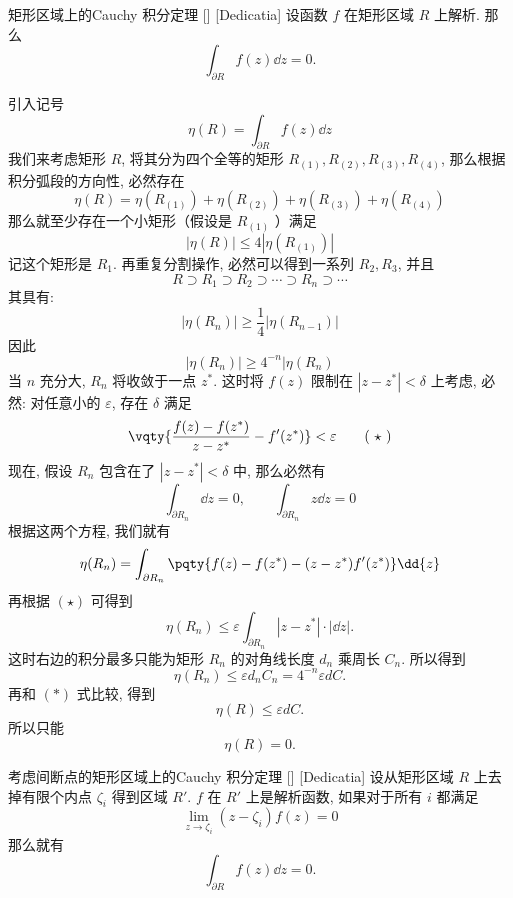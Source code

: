 \documentclass[UTF8]{ctexart}
\begin{document}
        \begin{thm}
            [UUID]
            {矩形区域上的Cauchy 积分定理}
            []
            [Dedicatia]
            设函数 \(f\) 在矩形区域 \(R\) 上解析. 那么
            \[\int_{\partial R}f(z)\dd{z}=0.\]
        \end{thm}

        \begin{prf}
            引入记号
            \[\eta(R)=\int_{\partial R}f(z)\dd{z}\]
            我们来考虑矩形 \(R\), 将其分为四个全等的矩形 \(R_{(1)}, R_{(2)}, R_{(3)}, R_{(4)}\), 那么根据积分弧段的方向性, 必然存在
            \[\eta(R)=\eta(R_{(1)})+\eta(R_{(2)})+\eta(R_{(3)})+\eta(R_{(4)})\]
            那么就至少存在一个小矩形（假设是 \(R_{(1)}\) ）满足
            \[|\eta(R)|\leqslant 4|\eta(R_{(1)})|\]
            记这个矩形是 \(R_1\). 再重复分割操作, 必然可以得到一系列 \(R_2, R_3\), 并且
            \[R\supset R_1\supset R_2\supset\cdots\supset R_n\supset\cdots\]
            其具有: 
            \[|\eta(R_n)|\geqslant \frac{1}{4}|\eta(R_{n-1})|\]
            因此
            \[|\eta(R_n)|\geqslant 4^{-n}|\eta(R_n)\tag{ \(\ast\) }\]
            当 \(n\) 充分大,  \(R_n\) 将收敛于一点 \(z^*\). 这时将 \(f(z)\) 限制在 \(|z-z^*|<\delta \) 上考虑, 必然: 对任意小的 \(\varepsilon\), 存在 \(\delta\) 满足
            \[\vqty{\frac{f(z)-f(z^*)}{z-z^*}-f'(z^*)}<\varepsilon\tag{ \(\star\) }\]
            现在, 假设 \(R_n\) 包含在了 \(|z-z^*|<\delta\) 中, 那么必然有
            \[\int_{\partial R_n}\dd{z}=0,\qquad\int_{\partial R_n}z\dd{z}=0\]
            根据这两个方程, 我们就有
            \[\eta(R_n)=\int_{\partial R_n}\pqty{f(z)-f(z^*)-(z-z^*)f'(z^*)}\dd{z}\]
            再根据 \((\star)\) 可得到
            \[\eta(R_n)\leqslant\varepsilon\int_{\partial R_n}|z-z^*|\cdot|\dd z|. \]
            这时右边的积分最多只能为矩形 \(R_n\) 的对角线长度 \(d_n\) 乘周长 \(C_n\). 所以得到
            \[\eta(R_n)\leqslant\varepsilon d_nC_n=4^{-n}\varepsilon dC.\]
            再和 \((\ast)\) 式比较, 得到
            \[\eta(R)\leqslant\varepsilon dC.\]
            所以只能
            \[\eta(R)=0.\]
        \end{prf}

        \begin{thm}
            [UUID]
            {考虑间断点的矩形区域上的Cauchy 积分定理}
            []
            [Dedicatia]
            设从矩形区域 \(R\) 上去掉有限个内点 \(\zeta_i\) 得到区域 \(R'\).  \(f\) 在 \(R'\) 上是解析函数, 如果对于所有 \(i\) 都满足
            \[\lim_{z\to\zeta_i }(z-\zeta_i)f(z)=0\]
            那么就有
            \[\int_{\partial R}f(z)\dd{z}=0.\]
        \end{thm}
\end{document}
